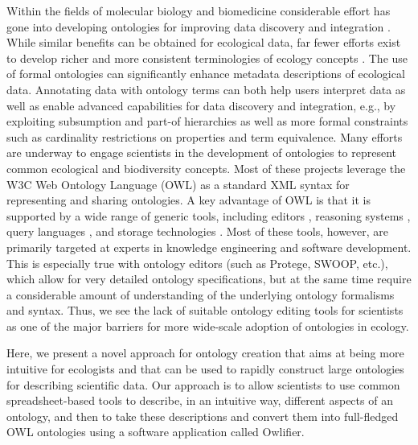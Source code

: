 \documentclass[preprint,number]{elsarticle}
\newcommand{\owlifier}{\textsf{Owlifier}}
\begin{document}
Within the fields of molecular biology and biomedicine considerable
effort has gone into developing ontologies for improving data
discovery and integration
\cite{bard04:_ontol_in_biolog,ashburner00:_gene_ontol}. While similar
benefits can be obtained for ecological data, far fewer efforts exist
to develop richer and more consistent terminologies of ecology
concepts
\cite{madin08:_advan_ecolog_resear_with_ontol,parr20:_data_sharin_in_ecolog_and_evolut}.
The use of formal ontologies can significantly enhance metadata
descriptions of ecological data. Annotating data with ontology terms
can both help users interpret data as well as enable advanced
capabilities for data discovery and integration, e.g., by exploiting
subsumption and part-of hierarchies as well as more formal constraints
such as cardinality restrictions on properties and term
equivalence. Many efforts are underway to engage scientists in the
development of ontologies to represent common ecological and
biodiversity concepts. Most of these projects leverage the W3C Web
Ontology Language (OWL) \cite{smith04:_owl_web_ontol_languag_guide} as
a standard XML syntax for representing and sharing ontologies. A key
advantage of OWL is that it is supported by a wide range of generic
tools, including editors
\cite{knublauch04:_editin_descr_logic_ontol_with,kalyanpur05:_swoop},
reasoning systems
\cite{sirin07:_pellet,tsarkov06:_fact_descr_logic_reason}, query
languages
\cite{prudhommeaux08:_sparq_query_languag_for_rdf,motik05:_query_answer_for_owl_dl_with_rules},
and storage technologies
\cite{carroll04:_jena,broekstra02:_sesam}. Most of these tools,
however, are primarily targeted at experts in knowledge engineering
and software development. This is especially true with ontology
editors (such as Protege, SWOOP, etc.), which allow for very detailed
ontology specifications, but at the same time require a considerable
amount of understanding of the underlying ontology formalisms and
syntax. Thus, we see the lack of suitable ontology editing tools for
scientists as one of the major barriers for more wide-scale adoption
of ontologies in ecology.

Here, we present a novel approach for ontology creation that aims at
being more intuitive for ecologists and that can be used to rapidly
construct large ontologies for describing scientific data. Our
approach is to allow scientists to use common spreadsheet-based tools
to describe, in an intuitive way, different aspects of an ontology,
and then to take these descriptions and convert them into full-fledged
OWL ontologies using a software application called \owlifier. 
\end{document}
